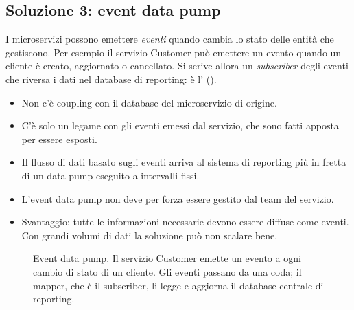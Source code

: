 \subsection{Soluzione 3: event data pump}

I microservizi possono emettere \emph{eventi} quando cambia lo stato delle entità che gestiscono. Per esempio il servizio
Customer può emettere un evento quando un cliente è creato, aggiornato o cancellato. Si scrive allora un
\emph{subscriber} degli eventi che riversa i dati nel database di reporting: è l'
().
\begin{itemize}
  \item Non c'è coupling con il database del microservizio di origine.
  \item C'è solo un legame con gli eventi emessi dal servizio, che sono fatti apposta per essere esposti.
  \item Il flusso di dati basato sugli eventi arriva al sistema di reporting più in fretta di un data pump eseguito a
    intervalli fissi.
  \item L'event data pump non deve per forza essere gestito dal team del servizio.
  \item Svantaggio: tutte le informazioni necessarie devono essere diffuse come eventi. Con grandi volumi di dati la
    soluzione può non scalare bene.
\end{itemize}

\begin{figure}[ht]
\centering
{}
\caption{Event data pump. Il servizio Customer emette un evento a ogni cambio di stato di un cliente. Gli eventi passano da
una coda; il mapper, che è il subscriber, li legge e aggiorna il database centrale di reporting.}
\label{fig:split-event}
\end{figure}

